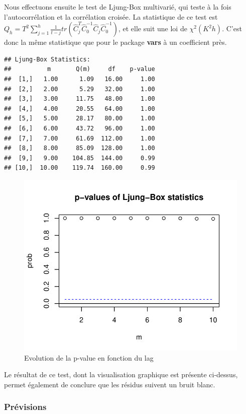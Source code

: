 \documentclass[11pt,]{article}
\begin{document}
Nous effectuons ensuite le test de Ljung-Box multivarié, qui teste à la
fois l'autocorrélation et la corrélation croisée. La statistique de ce
test est
\(Q_h = T^2 \sum_{j=1}^h \frac{1}{t-j} tr(\hat{C}_j^T \hat{C}_0^{-1} \hat{C}_j \hat{C}_0^{-1})\),
et elle suit une loi de \(\chi^2(K^2h)\). C'est donc la même statistique
que pour le package \textbf{vars} à un coefficient près.

\begin{verbatim}
## Ljung-Box Statistics:  
##          m       Q(m)     df    p-value
##  [1,]   1.00      1.09   16.00     1.00
##  [2,]   2.00      5.29   32.00     1.00
##  [3,]   3.00     11.75   48.00     1.00
##  [4,]   4.00     20.55   64.00     1.00
##  [5,]   5.00     28.17   80.00     1.00
##  [6,]   6.00     43.72   96.00     1.00
##  [7,]   7.00     61.69  112.00     1.00
##  [8,]   8.00     85.09  128.00     1.00
##  [9,]   9.00    104.85  144.00     0.99
## [10,]  10.00    119.74  160.00     0.99
\end{verbatim}

\begin{figure}[htbp]
\centering
\includegraphics{doc_files/figure-latex/unnamed-chunk-48-1.pdf}
\caption{\label{fig29} Evolution de la p-value en fonction du lag}
\end{figure}

Le résultat de ce test, dont la visualisation graphique est présente
ci-dessus, permet également de conclure que les résidus suivent un bruit
blanc.

\subsubsection{Prévisions}\label{previsions-1}
\end{document}
